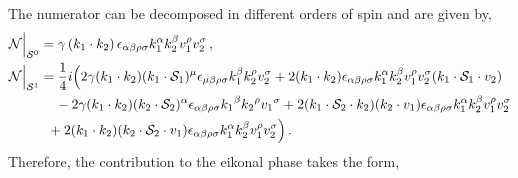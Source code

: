 The numerator can be decomposed in different orders of spin and are given by,
\begin{align}
    \begin{split}
&\mathcal{N}\Big|_{\mathcal{S}^0}=\gamma  \left(  k_1 \cdot k_2\right)  \epsilon_{\alpha \beta\rho\sigma} k_1^\alpha k_2^\beta v_1^\rho v_2^\sigma\,, \\ &
\mathcal{N}\Big|_{\mathcal{S}^1}=\frac{1}{4}i\Big(2\gamma(k_1\cdot k_2)(k_1\cdot \mathcal{S}_1)^\mu\epsilon_{\mu \beta\rho\sigma}k_1^\beta k_2^\rho v_2^\sigma+2(k_1\cdot k_2)\epsilon_{\alpha \beta\rho\sigma} k_1^\alpha k_2^\beta v_1^\rho v_2^\sigma (k_1\cdot \mathcal{S}_1\cdot v_2)\,\\&
\hspace{1.2 cm}-2\gamma(k_1\cdot k_2) (k_2\cdot{\mathcal{S}_2})^\alpha\epsilon_{\alpha\beta\rho\sigma}{k_1}^\beta {k_2}^\rho {v_1}^\sigma+2 (k_1\cdot \mathcal{S}_2\cdot k_2)(k_2\cdot v_1)\epsilon_{\alpha\beta\rho\sigma} k_1^\alpha k_2^\beta v_1^\rho v_2^\sigma\\&\hspace{1.0 cm}+2(k_1\cdot k_2)(k_2\cdot \mathcal{S}_2\cdot v_1) \epsilon_{\alpha \beta\rho\sigma} k_1^\alpha k_2^\beta v_1^\rho v_2^\sigma \Big)\,.
\end{split}
\end{align}
Therefore, the contribution to the eikonal phase takes the form, %

